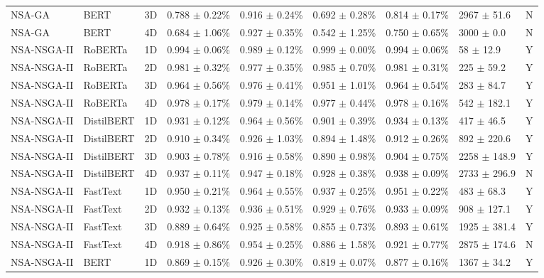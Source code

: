 \begin{table*}[h]
{\begin{tabular}{lllllllll}
NSA-GA & BERT & 3D & 0.788 $\pm$ 0.22\% & 0.916 $\pm$ 0.24\% & 0.692 $\pm$ 0.28\% & 0.814 $\pm$ 0.17\% & 2967 $\pm$ 51.6 & N \\
NSA-GA & BERT & 4D & 0.684 $\pm$ 1.06\% & 0.927 $\pm$ 0.35\% & 0.542 $\pm$ 1.25\% & 0.750 $\pm$ 0.65\% & 3000 $\pm$ 0.0 & N \\
NSA-NSGA-II & RoBERTa & 1D & 0.994 $\pm$ 0.06\% & 0.989 $\pm$ 0.12\% & 0.999 $\pm$ 0.00\% & 0.994 $\pm$ 0.06\% & 58 $\pm$ 12.9 & Y \\
NSA-NSGA-II & RoBERTa & 2D & 0.981 $\pm$ 0.32\% & 0.977 $\pm$ 0.35\% & 0.985 $\pm$ 0.70\% & 0.981 $\pm$ 0.31\% & 225 $\pm$ 59.2 & Y \\
NSA-NSGA-II & RoBERTa & 3D & 0.964 $\pm$ 0.56\% & 0.976 $\pm$ 0.41\% & 0.951 $\pm$ 1.01\% & 0.964 $\pm$ 0.54\% & 283 $\pm$ 84.7 & Y \\
NSA-NSGA-II & RoBERTa & 4D & 0.978 $\pm$ 0.17\% & 0.979 $\pm$ 0.14\% & 0.977 $\pm$ 0.44\% & 0.978 $\pm$ 0.16\% & 542 $\pm$ 182.1 & Y \\
NSA-NSGA-II & DistilBERT & 1D & 0.931 $\pm$ 0.12\% & 0.964 $\pm$ 0.56\% & 0.901 $\pm$ 0.39\% & 0.934 $\pm$ 0.13\% & 417 $\pm$ 46.5 & Y \\
NSA-NSGA-II & DistilBERT & 2D & 0.910 $\pm$ 0.34\% & 0.926 $\pm$ 1.03\% & 0.894 $\pm$ 1.48\% & 0.912 $\pm$ 0.26\% & 892 $\pm$ 220.6 & Y \\
NSA-NSGA-II & DistilBERT & 3D & 0.903 $\pm$ 0.78\% & 0.916 $\pm$ 0.58\% & 0.890 $\pm$ 0.98\% & 0.904 $\pm$ 0.75\% & 2258 $\pm$ 148.9 & Y \\
NSA-NSGA-II & DistilBERT & 4D & 0.937 $\pm$ 0.11\% & 0.947 $\pm$ 0.18\% & 0.928 $\pm$ 0.38\% & 0.938 $\pm$ 0.09\% & 2733 $\pm$ 296.9 & N \\
NSA-NSGA-II & FastText & 1D & 0.950 $\pm$ 0.21\% & 0.964 $\pm$ 0.55\% & 0.937 $\pm$ 0.25\% & 0.951 $\pm$ 0.22\% & 483 $\pm$ 68.3 & Y \\
NSA-NSGA-II & FastText & 2D & 0.932 $\pm$ 0.13\% & 0.936 $\pm$ 0.51\% & 0.929 $\pm$ 0.76\% & 0.933 $\pm$ 0.09\% & 908 $\pm$ 127.1 & Y \\
NSA-NSGA-II & FastText & 3D & 0.889 $\pm$ 0.64\% & 0.925 $\pm$ 0.58\% & 0.855 $\pm$ 0.73\% & 0.893 $\pm$ 0.61\% & 1925 $\pm$ 381.4 & Y \\
NSA-NSGA-II & FastText & 4D & 0.918 $\pm$ 0.86\% & 0.954 $\pm$ 0.25\% & 0.886 $\pm$ 1.58\% & 0.921 $\pm$ 0.77\% & 2875 $\pm$ 174.6 & N \\
NSA-NSGA-II & BERT & 1D & 0.869 $\pm$ 0.15\% & 0.926 $\pm$ 0.30\% & 0.819 $\pm$ 0.07\% & 0.877 $\pm$ 0.16\% & 1367 $\pm$ 34.2 & Y \\

\end{tabular}}
\end{table*}
